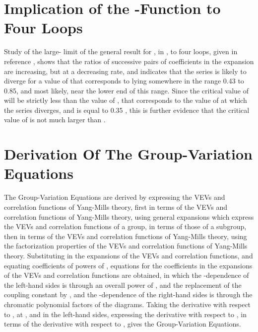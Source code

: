\documentclass[a4paper,12pt,oneside]{article}
\begin{document}
\section{Implication of the \myHighlight{$\beta$}\coordHE{}-Function to Four Loops}

Study of the large-\coordHE{} limit of the general result for \coordHE{}, in
\coordHE{}, to four loops, given in reference \cite{beta in MS bar 
2}, shows that the ratios of successive pairs of
coefficients in the expansion are increasing, but at a decreasing rate, and
indicates that the series is likely to diverge for a value of \coordHE{} that
corresponds to \coordHE{} lying somewhere in the range 0.43 to 0.85, and
most likely, near the lower end of this range.  Since the critical value of
\coordHE{} will be strictly less than the value of \coordHE{}, that
corresponds to the value of \coordHE{} at which the series diverges, and
\coordHE{} is equal to 0.35 \cite{beta in MS bar 1}, this is further evidence that the
critical value of \coordHE{} is not much larger than \coordHE{}.

\section{Derivation Of The Group-Variation Equations}
\label{Derivation}

The Group-Variation Equations are derived by expressing the VEVs and
correlation functions of \coordHE{} Yang-Mills theory, first in terms of the
VEVs and correlation functions of \coordHE{} Yang-Mills theory, using
general expansions which express the VEVs and correlation functions of a
group, in terms of those of a subgroup, then in terms of the VEVs and
correlation functions of \coordHE{} Yang-Mills theory, using the factorization
properties of the VEVs and correlation functions of \coordHE{} Yang-Mills
theory.  Substituting in the \coordHE{} expansions of the VEVs and correlation
functions, and equating coefficients of powers of \coordHE{}, equations for the
coefficients in the \coordHE{} expansions of the VEVs and correlation functions
are obtained, in which the \coordHE{}-dependence of the left-hand sides is through
an overall power of \coordHE{}, and the replacement of the coupling constant \coordHE{} by \coordHE{},
and the \coordHE{}-dependence of the right-hand sides is through the chromatic
polynomial factors \coordHE{} of the diagrams.  Taking the derivative
with respect to \coordHE{}, at \coordHE{}, and in the left-hand sides, expressing the
derivative with respect to \coordHE{}, in terms of the derivative with respect to
\coordHE{}, gives the Group-Variation Equations.
\end{document}
